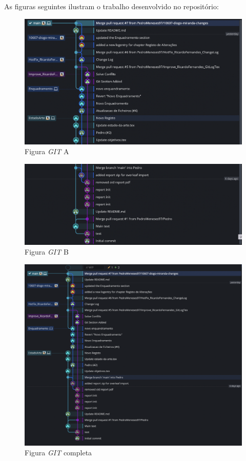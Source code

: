 \newpage

As figuras seguintes ilustram o trabalho desenvolvido no repositório:

\begin{figure}[H]
	\begin{center}
		\includegraphics[width=1.0\textwidth]{chapter/image/git1.png}
	\end{center}
		\caption{Figura \textit{GIT} A}
		\label{fig:git-pica}
\end{figure}



\begin{figure}[H]
	\begin{center}
		\includegraphics[width=1.0\textwidth]{chapter/image/git2.png}
	\end{center}
		\caption{Figura \textit{GIT} B}
		\label{fig:git-picb}
\end{figure}



\begin{figure}[H]
	\begin{center}
		\includegraphics[width=1.0\textwidth]{chapter/image/git3.png}
	\end{center}
		\caption{Figura \textit{GIT} completa}
		\label{fig:git-pic3}
\end{figure}

